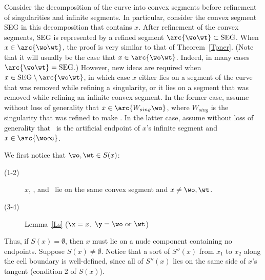 %
Consider the decomposition of the curve into convex segments before refinement
of singularities and infinite segments.
In particular, consider the convex segment SEG in this decomposition that contains $x$.
After refinement of the convex segments, SEG is represented by a refined segment
$\arc{\wo\wt} \subset \mbox{SEG}$.
When $x \in  \arc{\wo\wt}$, the proof is very similar to that of Theorem~\ref{Tpner}.
(Note that it will usually be the case that $x \in  \arc{\wo\wt}$.
Indeed, in many cases $\arc{\wo\wt} = \mbox{SEG}$.)
However, new ideas are required when $x \in \mbox{SEG} \setminus \arc{\wo\wt}$, 
in which case
$x$ either lies on a segment of the curve that was removed while refining a singularity,
or it lies on a segment that was removed while refining an infinite convex segment.
In the former case, 
assume without loss of generality that $x \in \arc{W_{sing}\wo}$,
where $W_{sing}$ is the singularity that was refined to make \wo.
In the latter case, assume without loss of generality that \wo\ is the artificial endpoint
of $x$'s infinite segment and $x \in \arc{\wo\infty}$.

We first notice that $\wo,\wt \in S(x)$:
%
\begin{description}
\item[(1-2)] 
	$x$, \wo, and \wt\ lie on the same convex segment and $x \neq \wo,\wt$.
\item[(3-4)]
	Lemma~\ref{Ls} ($\x = x$, $\y = \wo \mbox{ or } \wt$)
\end{description}
%
Thus, if $S(x) = \emptyset$, then $x$ must lie on a nude component containing no endpoints.
%
%
Suppose $S(x) \neq \emptyset$.
Notice that a sort of $S''(x)$ 
from $x_{1}$ to $x_{2}$ along the cell boundary is well-defined, 
since all of $S''(x)$ lies on the same side of $x$'s tangent
(condition 2 of $S(x)$).

